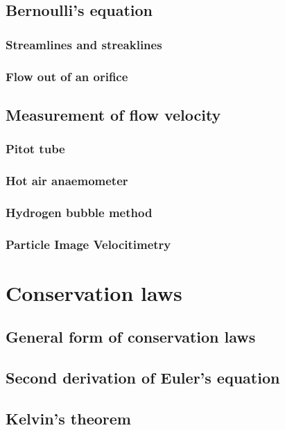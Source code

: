 \documentclass{tufte-book} %
\begin{document}
\section{Bernoulli's equation}
\subsection{Streamlines and streaklines}
\subsection{Flow out of an orifice}
\section{Measurement of flow velocity}
\subsection{Pitot tube}
\subsection{Hot air anaemometer}
\subsection{Hydrogen bubble method}
\subsection{Particle Image Velocitimetry}
\chapter{Conservation laws}
\section{General form of conservation laws}
\section{Second derivation of Euler's equation}
\section{Kelvin's theorem}
\end{document}
